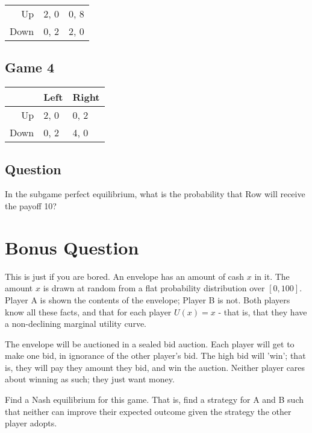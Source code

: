 \begin{multicols}{2}
\begin{minipage}{\linewidth}
\begin{tabulary}{\textwidth}{@{}rll@{}}
 Up & 2, 0 & 0, 8 \\
 Down & 0, 2 & 2, 0 \\
\bottomrule

\end{tabulary}
\end{minipage}

\subsection*{Game 4}
\label{game4}

\begin{minipage}{\linewidth}
\setlength{\tymax}{0.5\linewidth}
\centering
\small
\begin{tabulary}{\textwidth}{@{}rll@{}} \toprule
 & Left & Right \\
\midrule

 Up & 2, 0 & 0, 2 \\
 Down & 0, 2 & 4, 0 \\
\bottomrule

\end{tabulary}
\end{minipage}
\end{multicols}

\subsection*{Question}
\label{question}

In the subgame perfect equilibrium, what is the probability that Row will receive the payoff 10?

\bigskip

\section*{Bonus Question}

This is just if you are bored. An envelope has an amount of cash $x$ in it. The amount $x$ is drawn at random from a flat probability distribution over $[0, 100]$. Player A is shown the contents of the envelope; Player B is not. Both players know all these facts, and that for each player $U(x) = x$ - that is, that they have a non-declining marginal utility curve.

The envelope will be auctioned in a sealed bid auction. Each player will get to make one bid, in ignorance of the other player's bid. The high bid will 'win'; that is, they will pay they amount they bid, and win the auction. Neither player cares about winning as such; they just want money.

Find a Nash equilibrium for this game. That is, find a strategy for A and B such that neither can improve their expected outcome given the strategy the other player adopts.


